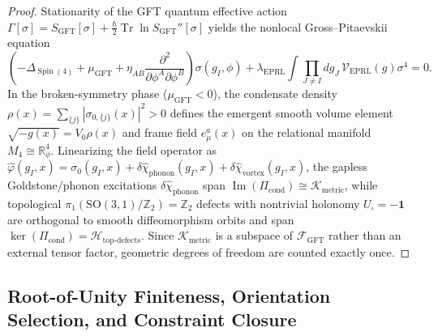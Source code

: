 \documentclass[11pt,a4paper]{article}
\theoremstyle{plain}
\theoremstyle{definition}
\theoremstyle{remark}
\newcommand{\Tr}{\operatorname{Tr}}
\newcommand{\Spin}{\operatorname{Spin}}
\newcommand{\SO}{\mathrm{SO}}
\newcommand{\K}{\mathcal{K}}
\newcommand{\Hilb}{\mathcal{H}}
\newcommand{\F}{\mathcal{F}}
\newcommand{\R}{\mathbb{R}}
\newcommand{\Z}{\mathbb{Z}}
\begin{document}
\begin{proof}
Stationarity of the GFT quantum effective action $\Gamma[\sigma] = S_{\mathrm{GFT}}[\sigma] + \frac{\hbar}{2}\Tr\ln S_{\mathrm{GFT}}''[\sigma]$ yields the nonlocal Gross--Pitaevskii equation
\begin{equation}
  \left( -\Delta_{\Spin(4)} + \mu_{\mathrm{GFT}} + \eta_{AB}\frac{\partial^2}{\partial\phi^A \partial\phi^B} \right) \sigma(g_I, \phi) + \lambda_{\mathrm{EPRL}} \int \prod_{J\neq I} dg_J \, \mathcal{V}_{\mathrm{EPRL}}(g) \sigma^4 = 0.
\end{equation}
In the broken-symmetry phase ($\mu_{\mathrm{GFT}} < 0$), the condensate density $\rho(x) = \sum_{\{j\}} |\sigma_{0,\{j\}}(x)|^2 > 0$ defines the emergent smooth volume element $\sqrt{-g(x)} = V_0 \rho(x)$ and frame field $e_\mu^a(x)$ on the relational manifold $M_4 \cong \R^4_\phi$. Linearizing the field operator as $\hat{\varphi}(g_I, x) = \sigma_0(g_I, x) + \delta\hat{\chi}_{\mathrm{phonon}}(g_I, x) + \delta\hat{\chi}_{\mathrm{vortex}}(g_I, x)$, the gapless Goldstone/phonon excitations $\delta\hat{\chi}_{\mathrm{phonon}}$ span $\operatorname{Im}(\Pi_{\mathrm{cond}}) \cong \K_{\mathrm{metric}}$, while topological $\pi_1(\SO(3,1)/\Z_2) = \Z_2$ defects with nontrivial holonomy $U_\square = -\mathbf{1}$ are orthogonal to smooth diffeomorphism orbits and span $\ker(\Pi_{\mathrm{cond}}) = \Hilb_{\mathrm{top\text{-}defects}}$. Since $\K_{\mathrm{metric}}$ is a subspace of $\F_{\mathrm{GFT}}$ rather than an external tensor factor, geometric degrees of freedom are counted exactly once.
\end{proof}

\subsection{Root-of-Unity Finiteness, Orientation Selection, and Constraint Closure}
\end{document}
